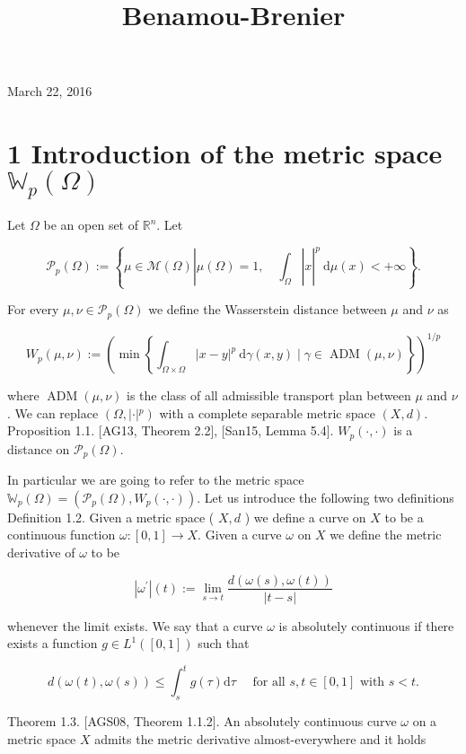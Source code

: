 \documentclass[10pt]{article}
\title{Benamou-Brenier }
\author{}
\date{}
\begin{document}
\maketitle
March 22, 2016

\section*{1 Introduction of the metric space \(\mathbb{W}_{p}(\Omega)\)}
Let \(\Omega\) be an open set of \(\mathbb{R}^{n}\). Let

\[
\mathcal{P}_{p}(\Omega):=\left\{\left.\mu \in \mathcal{M}(\Omega)\left|\mu(\Omega)=1, \quad \int_{\Omega}\right| x\right|^{p} \mathrm{~d} \mu(x)<+\infty\right\} .
\]

For every \(\mu, \nu \in \mathcal{P}_{p}(\Omega)\) we define the Wasserstein distance between \(\mu\) and \(\nu\) as

\[
W_{p}(\mu, \nu):=\left(\min \left\{\int_{\Omega \times \Omega}|x-y|^{p} \mathrm{~d} \gamma(x, y) \mid \gamma \in \operatorname{ADM}(\mu, \nu)\right\}\right)^{1 / p}
\]

where \(\operatorname{ADM}(\mu, \nu)\) is the class of all admissible transport plan between \(\mu\) and \(\nu\). We can replace \(\left(\Omega,|\cdot|{ }^{p}\right)\) with a complete separable metric space \((X, d)\).\\[0pt]
Proposition 1.1. [AG13, Theorem 2.2], [San15, Lemma 5.4]. \(W_{p}(\cdot, \cdot)\) is a distance on \(\mathcal{P}_{p}(\Omega)\).

In particular we are going to refer to the metric space \(\mathbb{W}_{p}(\Omega)=\left(\mathcal{P}_{p}(\Omega), W_{p}(\cdot, \cdot)\right)\). Let us introduce the following two definitions\\
Definition 1.2. Given a metric space ( \(X, d\) ) we define a curve on \(X\) to be a continuous function \(\omega:[0,1] \rightarrow X\). Given a curve \(\omega\) on \(X\) we define the metric derivative of \(\omega\) to be

\[
\left|\omega^{\prime}\right|(t):=\lim _{s \rightarrow t} \frac{d(\omega(s), \omega(t))}{|t-s|}
\]

whenever the limit exists. We say that a curve \(\omega\) is absolutely continuous if there exists a function \(g \in L^{1}([0,1])\) such that

\[
d(\omega(t), \omega(s)) \leq \int_{s}^{t} g(\tau) \mathrm{d} \tau \quad \text { for all } s, t \in[0,1] \text { with } s<t .
\]

Theorem 1.3. [AGS08, Theorem 1.1.2]. An absolutely continuous curve \(\omega\) on a metric space \(X\) admits the metric derivative almost-everywhere and it holds
\end{document}

